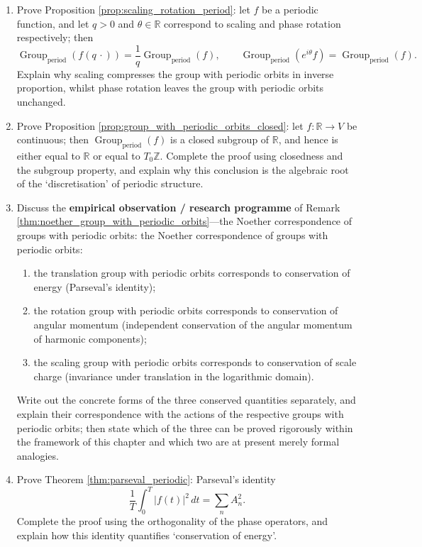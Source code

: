 \begin{enumerate}[leftmargin=3em, label=\textbf{Exercise \arabic*}]
    \item Prove Proposition \ref{prop:scaling_rotation_period}:
    let $f$ be a periodic function, and let $q>0$ and $\theta\in\mathbb{R}$ correspond to scaling and phase rotation respectively; then
    \[
    \operatorname{Group}_{\mathrm{period}}(f(q\,\cdot))=\frac{1}{q}\operatorname{Group}_{\mathrm{period}}(f),\qquad
    \operatorname{Group}_{\mathrm{period}}(e^{i\theta}f)=\operatorname{Group}_{\mathrm{period}}(f).
    \]
    Explain why scaling compresses the group with periodic orbits in inverse proportion, whilst phase rotation leaves the group with periodic orbits unchanged.

    \item Prove Proposition \ref{prop:group_with_periodic_orbits_closed}:
    let $f:\mathbb{R}\to V$ be continuous; then $\operatorname{Group}_{\mathrm{period}}(f)$ is a closed subgroup of $\mathbb{R}$,
    and hence is either equal to $\mathbb{R}$ or equal to $T_0\mathbb{Z}$.
    Complete the proof using closedness and the subgroup property, and explain why this conclusion is the algebraic root of the `discretisation' of periodic structure.

    \item Discuss the \textbf{empirical observation / research programme} of Remark \ref{thm:noether_group_with_periodic_orbits}---the Noether correspondence of groups with periodic orbits:
    the Noether correspondence of groups with periodic orbits:
    \begin{enumerate}[label=(\roman*)]
        \item the translation group with periodic orbits corresponds to conservation of energy (Parseval's identity);
        \item the rotation group with periodic orbits corresponds to conservation of angular momentum (independent conservation of the angular momentum of harmonic components);
        \item the scaling group with periodic orbits corresponds to conservation of scale charge (invariance under translation in the logarithmic domain).
    \end{enumerate}
    Write out the concrete forms of the three conserved quantities separately,
    and explain their correspondence with the actions of the respective groups with periodic orbits;
    then state which of the three can be proved rigorously within the framework of this chapter and which two are at present merely formal analogies.

    \item Prove Theorem \ref{thm:parseval_periodic}:
    Parseval's identity
    \[
    \frac{1}{T}\int_0^T|f(t)|^2\,dt=\sum_nA_n^2.
    \]
    Complete the proof using the orthogonality of the phase operators, and explain how this identity quantifies `conservation of energy'.


\end{enumerate}
